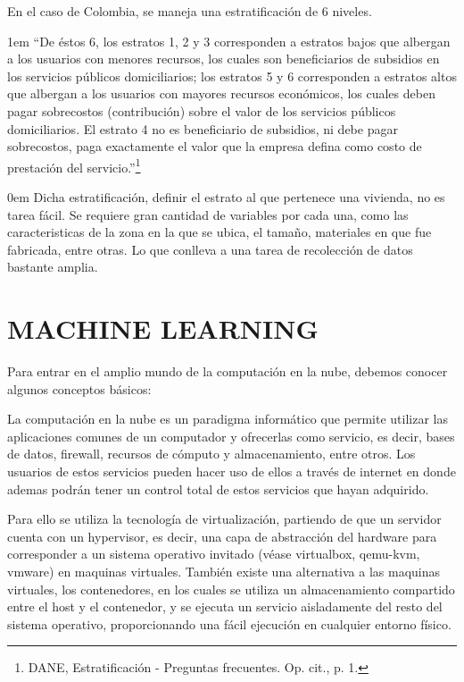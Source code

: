     En el caso de Colombia, se maneja una estratificación de 6 niveles.

	\leftskip1em
	\rightskip\leftskip
	{\footnotesize \hspace{\parindent} “De éstos 6, los estratos 1, 2 y 3 corresponden a estratos bajos que albergan a los usuarios con menores recursos, los cuales son beneficiarios de subsidios en los servicios públicos domiciliarios; los estratos 5 y 6 corresponden a estratos altos que albergan a los usuarios con mayores recursos económicos, los cuales deben pagar sobrecostos (contribución) sobre el valor de los servicios públicos domiciliarios. El estrato 4 no es beneficiario de subsidios, ni debe pagar sobrecostos, paga exactamente el valor que la empresa defina como costo de prestación del servicio.”\footnote[9]{DANE, Estratificación - Preguntas frecuentes. Op. cit., p. 1.}}
	
	\leftskip0em
    Dicha estratificación, definir el estrato al que pertenece una vivienda, no es tarea fácil. Se requiere gran cantidad de variables por cada una, como las caracteristicas de la zona en la que se ubica, el tamaño, materiales en que fue fabricada, entre otras. Lo que conlleva a una tarea de recolección de datos bastante amplia.   

    
    \section{MACHINE LEARNING}
    Para entrar en el amplio mundo de la computación en la nube, debemos conocer algunos conceptos básicos:
    
   La computación en la nube es un paradigma informático que permite utilizar las aplicaciones comunes de un computador y ofrecerlas como servicio, es decir, bases de datos, firewall, recursos de cómputo y almacenamiento, entre otros. Los usuarios de estos servicios pueden hacer uso de ellos a través de internet en donde ademas podrán tener un control total de estos servicios que hayan adquirido.
    
    Para ello se utiliza la tecnología de virtualización, partiendo de que un servidor cuenta con un hypervisor, es decir, una capa de abstracción del hardware para corresponder a un sistema operativo invitado (véase virtualbox, qemu-kvm, vmware) en maquinas virtuales. También existe una alternativa  a las maquinas virtuales, los contenedores, en los cuales se utiliza un almacenamiento compartido entre el host y el contenedor, y se ejecuta un servicio aisladamente del resto del sistema operativo, proporcionando una fácil ejecución en cualquier entorno físico.
    
